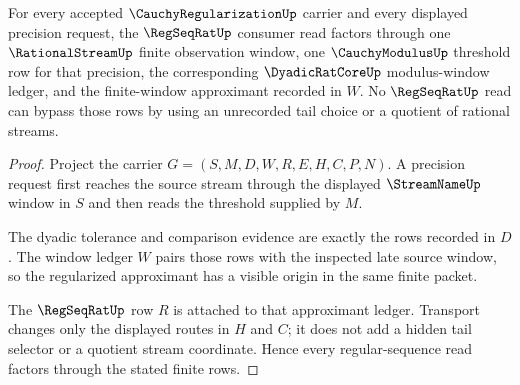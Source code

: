 \begin{theorem}
\label{thm:cauchyregularization-regular-sequence-handoff}
For every accepted $\CauchyRegularizationUp$ carrier and every displayed
precision request, the $\RegSeqRatUp$ consumer read factors through one
$\RationalStreamUp$ finite observation window, one $\CauchyModulusUp$
threshold row for that precision, the corresponding $\DyadicRatCoreUp$
modulus-window ledger, and the finite-window approximant recorded in $W$.
No $\RegSeqRatUp$ read can bypass those rows by using an unrecorded tail
choice or a quotient of rational streams.
\end{theorem}
\begin{proof}
Project the carrier
$G=(S,M,D,W,R,E,H,C,P,N)$. A precision request first reaches the source
stream through the displayed $\StreamNameUp$ window in $S$ and then reads the
threshold supplied by $M$.

The dyadic tolerance and comparison evidence are exactly the rows recorded in
$D$. The window ledger $W$ pairs those rows with the inspected late source
window, so the regularized approximant has a visible origin in the same
finite packet.

The $\RegSeqRatUp$ row $R$ is attached to that approximant ledger. Transport
changes only the displayed routes in $H$ and $C$; it does not add a hidden tail
selector or a quotient stream coordinate. Hence every regular-sequence read
factors through the stated finite rows.
\end{proof}

